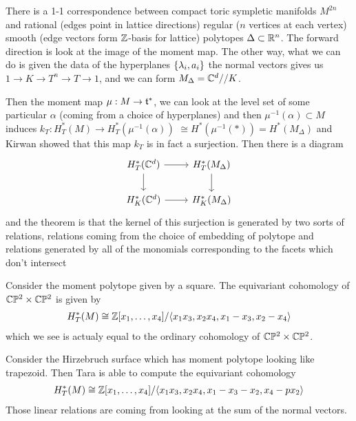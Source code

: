 \documentclass[12pt]{article}
\begin{document}
\begin{theorem}
    There is a 1-1 correspondence between compact toric sympletic manifolds $M^{2n}$ and rational (edges point in lattice directions) regular ($n$ vertices at each vertex) smooth (edge vectors form $\mathbb{Z}$-basis for lattice) polytopes $\Delta\subset\mathbb{R}^n$. The forward direction is look at the image of the moment map. The other way, what we can do is given the data of the hyperplanes $\{\lambda_i,a_i\}$ the normal vectors gives us $1\to K\to T^n\to T\to 1$, and we can form $M_\Delta = \mathbb{C}^d // K$.

\end{theorem}
Then the moment map $\mu:M\to\mathfrak{t}^*$, we can look at the level set of some particular $\alpha$ (coming from a choice of hyperplanes) and then $\mu^{-1}(\alpha) \subset M$ induces $k_T:H^*_T(M)\to H^*_T(\mu^{-1}(\alpha))$  $\cong H^*(\mu^{-1}(*)) = H^*(M_\Delta)$ and Kirwan showed that this map $k_T$ is in fact a surjection. Then there is a diagram 
\[\begin{tikzcd}
	{H^*_T(\C^d)} & {H^*_T(M_\Delta)} \\
	{H^*_K(\C^d)} & {H^*_K(M_\Delta)}
	\arrow[from=1-1, to=1-2]
	\arrow[from=1-2, to=2-2]
	\arrow[from=1-1, to=2-1]
	\arrow[from=2-1, to=2-2]
\end{tikzcd}\] and the theorem is that the kernel of this surjection is generated by two sorts of relations, relations coming from the choice of embedding of polytope  and relations generated by all of the monomials corresponding to the facets which don't intersect 

\begin{example}
    Consider the moment polytope given by a square. The equivariant cohomology of $\mathbb{C}\mathbb{P}^2\times\mathbb{C}\mathbb{P}^2$ is given by \begin{align*}
        H_T^*(M) \cong \mathbb{Z}[x_1,\dots,x_4]/\langle{x_1x_3,x_2x_4,x_1-x_3,x_2-x_4}\rangle 
    \end{align*} which we see is actualy equal to the ordinary cohomology of $\mathbb{C}\mathbb{P}^2\times\mathbb{C}\mathbb{P}^2$. 
\end{example}

\begin{example}
Consider the Hirzebruch surface which has moment polytope looking like trapezoid. Then Tara is able to compute the equivariant cohomology \begin{align*}
    H_T^*(M) \cong \mathbb{Z}[x_1,\dots,x_4]/\langle{x_1x_3,x_2x_4,x_1-x_3-x_2,x_4-px_2}\rangle 
\end{align*} Those linear relations are coming from looking at the sum of the normal vectors.
\end{example}
\end{document}
